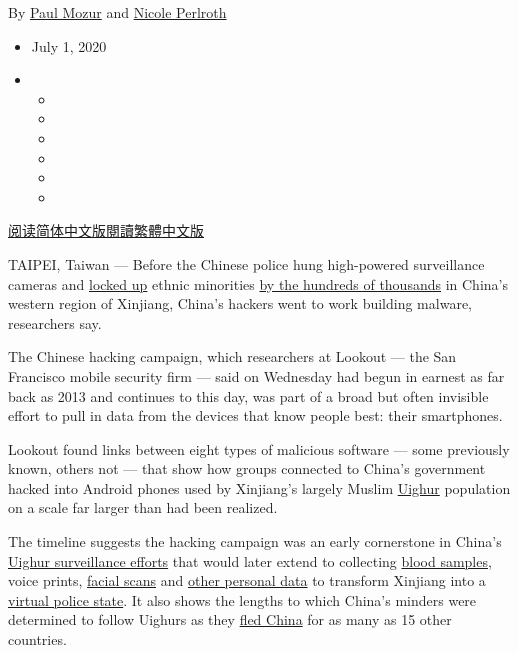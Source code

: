 By \href{https://www.nytimes.com/by/paul-mozur}{Paul Mozur} and
\href{https://www.nytimes.com/by/nicole-perlroth}{Nicole Perlroth}

\begin{itemize}
\item
  July 1, 2020
\item
  \begin{itemize}
  \item
  \item
  \item
  \item
  \item
  \item
  \end{itemize}
\end{itemize}

\href{https://cn.nytimes.com/technology/20200702/china-uighurs-hackers-malware-hackers-smartphones/}{阅读简体中文版}\href{https://cn.nytimes.com/technology/20200702/china-uighurs-hackers-malware-hackers-smartphones/zh}{閱讀繁體中文版}

TAIPEI, Taiwan --- Before the Chinese police hung high-powered
surveillance cameras and
\href{https://www.nytimes.com/2019/08/31/world/asia/xinjiang-china-uighurs-prisons.html}{locked
up} ethnic minorities
\href{https://apnews.com/269b3de1af34e17c1941a514f78d764c}{by the
hundreds of thousands} in China's western region of Xinjiang, China's
hackers went to work building malware, researchers say.

The Chinese hacking campaign, which researchers at Lookout --- the San
Francisco mobile security firm --- said on Wednesday had begun in
earnest as far back as 2013 and continues to this day, was part of a
broad but often invisible effort to pull in data from the devices that
know people best: their smartphones.

Lookout found links between eight types of malicious software --- some
previously known, others not --- that show how groups connected to
China's government hacked into Android phones used by Xinjiang's largely
Muslim
\href{https://www.nytimes.com/2020/07/06/world/asia/china-xinjiang-uighur-court.html}{Uighur}
population on a scale far larger than had been realized.

The timeline suggests the hacking campaign was an early cornerstone in
China's
\href{https://www.nytimes.com/2019/05/22/world/asia/china-surveillance-xinjiang.html}{Uighur
surveillance efforts} that would later extend to collecting
\href{https://www.nytimes.com/2019/02/21/business/china-xinjiang-uighur-dna-thermo-fisher.html}{blood
samples}, voice prints,
\href{https://www.nytimes.com/2019/12/03/business/china-dna-uighurs-xinjiang.html}{facial
scans} and
\href{https://www.nytimes.com/2019/12/17/technology/china-surveillance.html}{other
personal data} to transform Xinjiang into a
\href{https://www.nytimes.com/2018/09/08/world/asia/china-uighur-muslim-detention-camp.html}{virtual
police state}. It also shows the lengths to which China's minders were
determined to follow Uighurs as they
\href{https://www.dw.com/en/how-china-intimidates-uighurs-abroad-by-threatening-their-families/a-49554977}{fled
China} for as many as 15 other countries.

